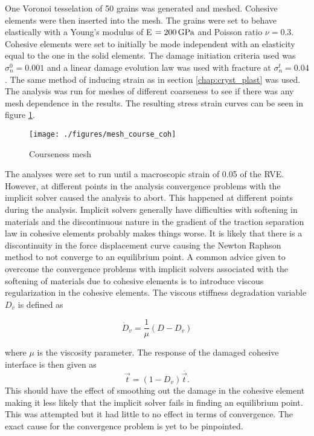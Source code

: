 \documentclass[grain_boundary_law.tex]{subfiles}
\begin{document}
One Voronoi tesselation of 50 grains was generated and meshed. Cohesive elements were then inserted into the mesh. The grains were set to behave elastically with a Young's modulus of E $= \unit[200]{GPa}$ and Poisson ratio $\nu = 0.3$. Cohesive elements were set to initially be mode independent with an elasticity equal to the one in the solid elements. The damage initiation criteria used was $\sigma_n^0 = 0.001$ and a linear damage evolution law was used with fracture at $\sigma_n^t = 0.04$. The same method of inducing strain as in section \ref{chap:cryst_plast} was used. The analysis was run for meshes of different coarseness to see if there was any mesh dependence in the results. The resulting stress strain curves can be seen in figure \ref{fig:coarse_coh}.
%
%
\begin{figure}[htpb!]
\centering
\texttt{[image: ./figures/mesh\_course\_coh]}
\caption{Courseness mesh}
\label{fig:coarse_coh}
\end{figure}
%
 The analyses were set to run until a macroscopic strain of 0.05 of the RVE. However, at different points in the analysis convergence problems with the implicit solver caused the analysis to abort. This happened at different points during the analysis. Implicit solvers generally have difficulties with softening in materials and the discontinuous nature in the gradient of the traction separation law in cohesive elements probably makes things worse. It is likely that there is a discontinuity in the force displacement curve causing the Newton Raphson method to not converge to an equilibrium point. A common advice given to overcome the convergence problems with implicit solvers associated with the softening of materials due to cohesive elements is to introduce viscous regularization in the cohesive elements. The viscous stiffness degradation variable $D_v$ is defined as
 
\begin{equation}
  \dot{D}_v = \frac{1}{\mu} (D - D_v)
\end{equation}

where $\mu$ is the viscosity parameter. The response of the damaged cohesive interface is then given as
%
\begin{equation}
  \vec{t} = (1 - D_v) \overline{\vec{t}}.
\end{equation}
%
This should have the effect of smoothing out the damage in the cohesive element making it less likely that the implicit solver fails in finding an equilibrium point. This was attempted but it had little to no effect in terms of convergence. The exact cause for the convergence problem is yet to be pinpointed.
\end{document}
